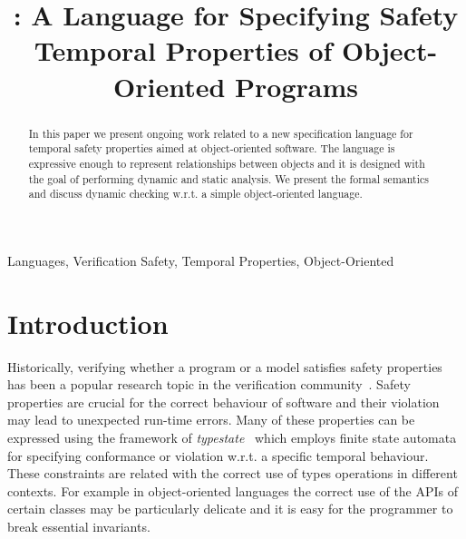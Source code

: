 \documentclass[preprint]{sigplanconf} %
\title{\TPL: A Language for Specifying Safety Temporal Properties of Object-Oriented Programs}
\theoremstyle{definition}
\theoremstyle{remark}
\begin{document}
\maketitle

\begin{abstract} %
In this paper we present ongoing work related to a new specification language for temporal safety properties aimed at object-oriented software.
The language is expressive enough to represent relationships between objects and it is designed with the goal of performing dynamic and static analysis. 
We present the formal semantics and discuss dynamic checking w.r.t. a simple object-oriented language.
\end{abstract}
\terms Languages, Verification
\keywords Safety, Temporal Properties, Object-Oriented

\section{Introduction} %
Historically, verifying whether a program or a model satisfies  safety properties has been a popular research topic in the
verification community~\cite{pnueli,spin,slam}. Safety properties are crucial for the correct behaviour of software and their  violation  may lead to unexpected run-time errors.
%
Many of these properties can be expressed using the framework of {\em typestate}~\cite{strom1986} which employs finite state automata for specifying conformance or violation w.r.t. a specific temporal behaviour.
These constraints are related with the correct use of types operations in different contexts.
For example in object-oriented languages the correct use of the APIs of certain classes may be particularly delicate and it is easy for the programmer to break essential invariants.
\end{document}

